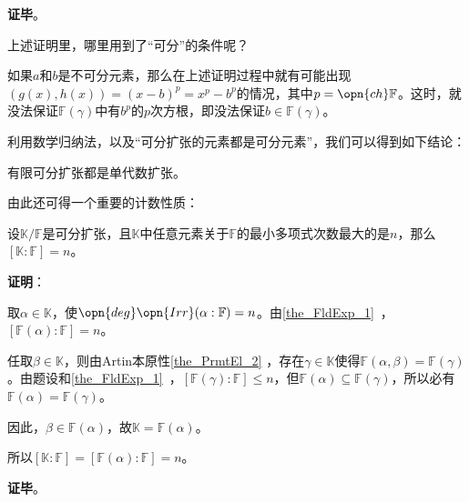 \textbf{证毕}。

上述证明里，哪里用到了“可分”的条件呢？

如果$a$和$b$是不可分元素，那么在上述证明过程中就有可能出现$(g(x), h(x))=(x-b)^p=x^p-b^p$的情况，其中$p=\opn{ch}\mathbb{F}$。这时，就没法保证$\mathbb{F}(\gamma)$中有$b^p$的$p$次方根，即没法保证$b\in\mathbb{F}(\gamma)$。

利用数学归纳法，以及“可分扩张的元素都是可分元素”，我们可以得到如下结论：

\begin{corollary}{}\label{cor_PrmtEl_2}
有限可分扩张都是单代数扩张。
\end{corollary}



由此还可得一个重要的计数性质：

\begin{corollary}{}\label{cor_PrmtEl_3}
设$\mathbb{K}/\mathbb{F}$是可分扩张，且$\mathbb{K}$中任意元素关于$\mathbb{F}$的最小多项式次数最大的是$n$，那么$[\mathbb{K}:\mathbb{F}] = n$。
\end{corollary}

\textbf{证明}：

取$\alpha\in\mathbb{K}$，使$\opn{deg}\opn{Irr}(\alpha:\mathbb{F})=n$。由\autoref{the_FldExp_1}~，$[\mathbb{F}(\alpha):\mathbb{F}]=n$。

任取$\beta\in\mathbb{K}$，则由Artin本原性\autoref{the_PrmtEl_2} ，存在$\gamma\in\mathbb{K}$使得$\mathbb{F}(\alpha, \beta)=\mathbb{F}(\gamma)$。由题设和\autoref{the_FldExp_1}~，$[\mathbb{F}(\gamma):\mathbb{F}]\leq n$，但$\mathbb{F}(\alpha)\subseteq\mathbb{F}(\gamma)$，所以必有$\mathbb{F}(\alpha)=\mathbb{F}(\gamma)$。

因此，$\beta\in\mathbb{F}(\alpha)$，故$\mathbb{K}=\mathbb{F}(\alpha)$。

所以$[\mathbb{K}:\mathbb{F}]=[\mathbb{F}(\alpha):\mathbb{F}]=n$。

\textbf{证毕}。
















